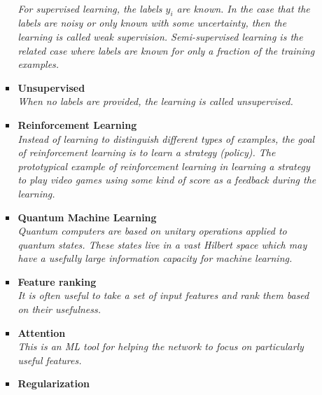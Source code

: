 \documentclass[12pt,letterpaper]{article}
\begin{document}
\begin{itemize}
\begin{itemize}
\begin{itemize}
				\\\textit{For supervised learning, the labels $y_i$ are known.  In the case that the labels are noisy or only known with some uncertainty, then the learning is called weak supervision.  Semi-supervised learning is the related case where labels are known for only a fraction of the training examples.}
				\item \textbf{Unsupervised}~\cite{Mackey:2015hwa,Komiske:2019fks,1797846,Dillon:2019cqt,Cai:2020vzx,Howard:2021pos,Dillon:2021gag,Huang:2023kgs,Kitouni:2023rct,Badea:2023jdb}
				\\\textit{When no labels are provided, the learning is called unsupervised.}
				\item \textbf{Reinforcement Learning}~\cite{Carrazza:2019efs,Brehmer:2020brs,John:2020sak,Harvey:2021oue,Cranmer:2021gdt,Windisch:2021mem,Dersy:2022bym,Nishimura:2023wdu,Alvestad:2023jgl}
				\\\textit{Instead of learning to distinguish different types of examples, the goal of reinforcement learning is to learn a strategy (policy).  The prototypical example of reinforcement learning in learning a strategy to play video games using some kind of score as a feedback during the learning.}
				\item \textbf{Quantum Machine Learning}~\cite{Mott:2017xdb,Zlokapa:2019lvv,Blance:2020nhl,Terashi:2020wfi,Chen:2020zkj,Wu:2020cye,Guan:2020bdl,Chen:2021ouz,Blance:2021gcs,Heredge:2021vww,Wu:2021xsj,Belis:2021zqi,Araz:2021ifk,Bravo-Prieto:2021ehz,Kim:2021wrr,Ngairangbam:2021yma,Gianelle:2022unu,Abel:2022lqr,Araz:2022haf,Delgado:2022aty,Alvi:2022fkk,Peixoto:2022zzk,Araz:2022zxk,Duckett:2022ccc,Rousselot:2023pcj,Schuhmacher:2023pro,Rehm:2023ovj}
				\\\textit{Quantum computers are based on unitary operations applied to quantum states.  These states live in a vast Hilbert space which may have a usefully large information capacity for machine learning.}
				\item \textbf{Feature ranking}~\cite{Faucett:2020vbu,Grojean:2020ech,Das:2022cjl}
				\\\textit{It is often useful to take a set of input features and rank them based on their usefulness.}
				\item \textbf{Attention}~\cite{goto2021development,Finke:2023veq,Qiu:2023ihi,Biassoni:2023lih,Kach:2023rqw}
				\\\textit{This is an ML tool for helping the network to focus on particularly useful features.}
				\item \textbf{Regularization}~\cite{Araz:2021wqm,Sforza:2013hua}

\end{itemize}
\end{itemize}
\end{itemize}
\end{document}
